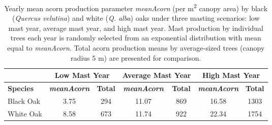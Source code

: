 
\begin{table}[htbp]
  \centering
  \caption{Yearly mean acorn production parameter \textit{meanAcorn} (per m\textsuperscript{2} canopy area) by black (\textit{Quercus velutina}) and white (\textit{Q. alba}) oaks under three masting scenarios: low mast year, average mast year, and high mast year. Mast production by individual trees each year is randomly selected from an exponential distribution with mean equal to \textit{meanAcorn}. Total acorn production means by average-sized trees (canopy radius 5 m) are presented for comparison.}
    \begin{tabular}{rcccccc}
    \toprule
          & \multicolumn{2}{c}{\textbf{Low Mast Year}} & \multicolumn{2}{c}{\textbf{Average Mast Year}} & \multicolumn{2}{c}{\textbf{High Mast Year}} \\
    \midrule
    \multicolumn{1}{l}{\textbf{Species}} & \textit{\textbf{meanAcorn}} & \textbf{Total} & \textit{\textbf{meanAcorn}} & \textbf{Total} & \textit{\textbf{meanAcorn}} & \textbf{Total} \\
    \multicolumn{1}{l}{Black Oak} & 3.75  & 294   & 11.07 & 869   & 16.58 & 1303 \\
    \multicolumn{1}{l}{White Oak} & 8.58  & 673   & 11.74 & 922   & 22.34 & 1754 \\
    \bottomrule
    \end{tabular}%
  \label{tab:2}%
\end{table}%


